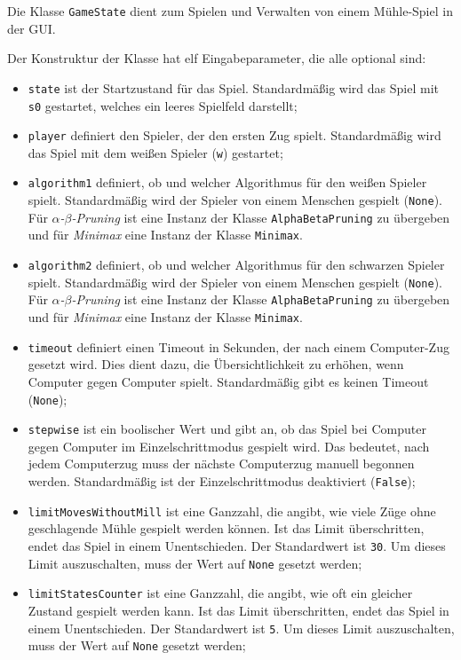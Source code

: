 \documentclass[11pt]{article}
\begin{document}
{Die Klasse \texttt{GameState} dient zum Spielen und Verwalten von einem
Mühle-Spiel in der GUI.

Der Konstruktur der Klasse hat elf Eingabeparameter, die alle optional
sind:
\begin{itemize}
    \item \texttt{state} ist der Startzustand für das Spiel. Standardmäßig wird das Spiel mit \texttt{s0} gestartet, welches ein leeres Spielfeld darstellt;
    \item \texttt{player} definiert den Spieler, der den ersten Zug spielt. Standardmäßig wird das Spiel mit dem weißen Spieler (\texttt{w}) gestartet;
    \item \texttt{algorithm1} definiert, ob und welcher Algorithmus für den weißen Spieler spielt. Standardmäßig wird der Spieler von einem Menschen gespielt (\texttt{None}). Für \emph{$\alpha$-$\beta$-Pruning} ist eine Instanz der Klasse \texttt{AlphaBetaPruning} zu übergeben und für \emph{Minimax} eine Instanz der Klasse \texttt{Minimax}.
    \item \texttt{algorithm2} definiert, ob und welcher Algorithmus für den schwarzen Spieler spielt. Standardmäßig wird der Spieler von einem Menschen gespielt (\texttt{None}). Für \emph{$\alpha$-$\beta$-Pruning} ist eine Instanz der Klasse \texttt{AlphaBetaPruning} zu übergeben und für \emph{Minimax} eine Instanz der Klasse \texttt{Minimax}.
    \item \texttt{timeout} definiert einen Timeout in Sekunden, der nach einem Computer-Zug gesetzt wird. Dies dient dazu, die Übersichtlichkeit zu erhöhen, wenn Computer gegen Computer spielt. Standardmäßig gibt es keinen Timeout (\texttt{None});
    \item \texttt{stepwise} ist ein boolischer Wert und gibt an, ob das Spiel bei Computer gegen Computer im Einzelschrittmodus gespielt wird. Das bedeutet, nach jedem Computerzug muss der nächste Computerzug manuell begonnen werden. Standardmäßig ist der Einzelschrittmodus deaktiviert (\texttt{False});
    \item \texttt{limitMovesWithoutMill} ist eine Ganzzahl, die angibt, wie viele Züge ohne geschlagende Mühle gespielt werden können. Ist das Limit überschritten, endet das Spiel in einem Unentschieden. Der Standardwert ist \texttt{30}. Um dieses Limit auszuschalten, muss der Wert auf \texttt{None} gesetzt werden;
    \item \texttt{limitStatesCounter} ist eine Ganzzahl, die angibt, wie oft ein gleicher Zustand gespielt werden kann. Ist das Limit überschritten, endet das Spiel in einem Unentschieden. Der Standardwert ist \texttt{5}. Um dieses Limit auszuschalten, muss der Wert auf \texttt{None} gesetzt werden;


\end{itemize}}
\end{document}
